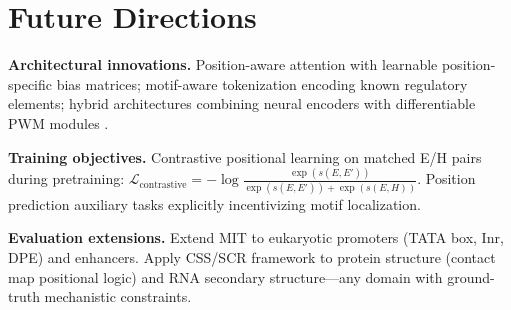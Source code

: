 \documentclass{article}
\begin{document}
\section{Future Directions}
\label{app:future}

\textbf{Architectural innovations.}
Position-aware attention with learnable position-specific bias matrices;
motif-aware tokenization encoding known regulatory elements;
hybrid architectures combining neural encoders with differentiable PWM modules
\citep{avsec2021bpnet,alipanahi2015predicting}.

\textbf{Training objectives.}
Contrastive positional learning on matched E/H pairs during pretraining:
$\mathcal{L}_{\text{contrastive}} = -\log \frac{\exp(s(E, E'))}{\exp(s(E,E')) + \exp(s(E,H))}$.
Position prediction auxiliary tasks explicitly incentivizing motif localization.

\textbf{Evaluation extensions.}
Extend MIT to eukaryotic promoters (TATA box, Inr, DPE) and enhancers.
Apply CSS/SCR framework to protein structure (contact map positional logic) and RNA
secondary structure---any domain with ground-truth mechanistic constraints.
\end{document}
